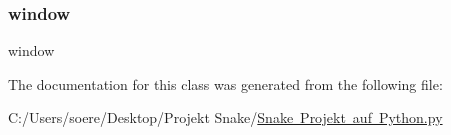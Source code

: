 \mbox{\label{class_snake_01_projekt_01auf_01_python_1_1_arduino_a04a8a2bbfa9c15500892b8e5033d625b}} 
\subsubsection{\texorpdfstring{window}{window}}
{\footnotesize\ttfamily window}



The documentation for this class was generated from the following file\+:\begin{DoxyCompactItemize}
\item 
C\+:/\+Users/soere/\+Desktop/\+Projekt Snake/\mbox{\hyperlink{_snake_01_projekt_01auf_01_python_8py}{Snake Projekt auf Python.\+py}}\end{DoxyCompactItemize}
